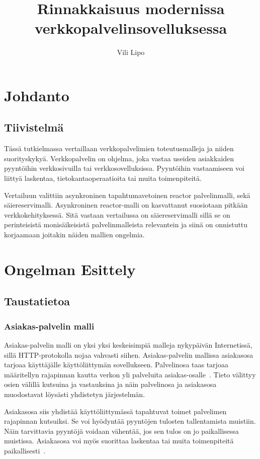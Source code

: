 \documentclass[12pt]{article}
\title{Rinnakkaisuus modernissa verkkopalvelinsovelluksessa}
\author{Vili Lipo}
\begin{document}
\maketitle
\newpage
\tableofcontents
\newpage
\section{Johdanto}
\subsection{Tiivistelmä}
Tässä tutkielmassa vertaillaan verkkopalvelimien toteutusmalleja
ja niiden suorityskykyä. Verkkopalvelin on ohjelma, joka vastaa useiden asiakkaiden pyyntöihin
verkkosivuilla tai verkkosovelluksissa. Pyyntöihin vastaamiseen
voi liittyä laskentaa, tietokantaoperaatioita tai muita toimenpiteitä.

Vertailuun valittiin asynkroninen tapahtumavetoinen reactor palvelinmalli, sekä säiereservimalli.
Asynkroninen reactor-malli on kasvattanut suosiotaan pitkään verkkokehityksessä.
Sitä vastaan vertailussa on säiereservimalli sillä se on perinteisistä
monisäikeisistä palvelinmalleista relevantein ja siinä on onnistuttu korjaamaan
joitakin näiden mallien ongelmia.
\section{Ongelman Esittely}
\subsection{Taustatietoa}
\subsubsection{Asiakas-palvelin malli}
Asiakas-palvelin malli on yksi yksi keskeisimpiä malleja nykypäivän Internetissä,
sillä HTTP-protokolla nojaa vahvasti siihen. Asiakas-palvelin mallissa
asiakasosa tarjoaa käyttäjälle käyttöliittymän sovellukseen. Palvelinosa taas
tarjoaa määritellyn rajapinnan kautta verkon yli
palveluita asiakas-osalle~\cite{sinha_client-server_1992}.
Tieto välittyy osien välillä kutsuina ja vastauksina ja näin palvelinosa ja asiakasosa
muodostavat löysästi yhdistetyn järjestelmän.

Asiakasosa siis yhdistää käyttöliittymässä tapahtuvat toimet palvelimen
rajapinnan kutsuiksi. Se voi hyödyntää pyyntöjen tulosten tallentamista
muistiin. Näin tarvittavia pyyntöjä voidaan vähentää, jos sen tulos
on jo paikallisessa muistissa. Asiakasosa voi myös suorittaa
laskentaa tai muita toimenpiteitä paikallisesti~\cite{sinha_client-server_1992}.
\end{document}
